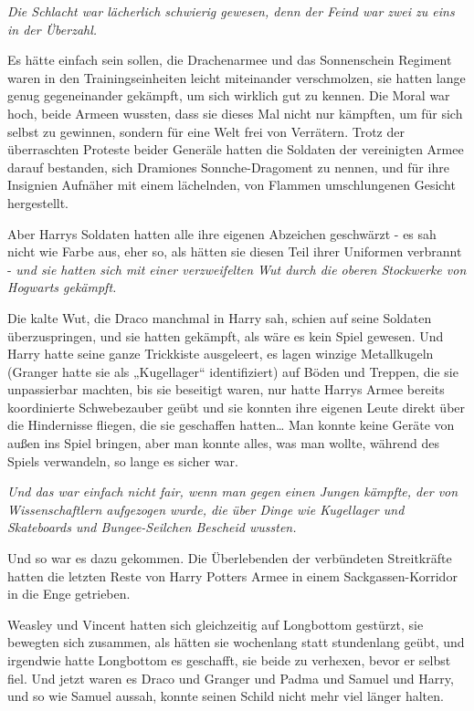 {\emph{Die Schlacht war lächerlich schwierig gewesen, denn der Feind war zwei zu eins in der Überzahl.}

Es hätte einfach sein sollen, die Drachenarmee und das Sonnenschein Regiment waren in den Trainingseinheiten leicht miteinander verschmolzen, sie hatten lange genug gegeneinander gekämpft, um sich wirklich gut zu kennen. Die Moral war hoch, beide Armeen wussten, dass sie dieses Mal nicht nur kämpften, um für sich selbst zu gewinnen, sondern für eine Welt frei von Verrätern. Trotz der überraschten Proteste beider Generäle hatten die Soldaten der vereinigten Armee darauf bestanden, sich Dramiones Sonnche-Dragoment zu nennen, und für ihre Insignien Aufnäher mit einem lächelnden, von Flammen umschlungenen Gesicht hergestellt.

Aber Harrys Soldaten hatten alle ihre eigenen Abzeichen geschwärzt - es sah nicht wie Farbe aus, eher so, als hätten sie diesen Teil ihrer Uniformen verbrannt - \emph{und sie hatten sich mit einer verzweifelten Wut durch die oberen Stockwerke von Hogwarts gekämpft.}

Die kalte Wut, die Draco manchmal in Harry sah, schien auf seine Soldaten überzuspringen, und sie hatten gekämpft, als wäre es kein Spiel gewesen. Und Harry hatte seine ganze Trickkiste ausgeleert, es lagen winzige Metallkugeln (Granger hatte sie als „Kugellager“ identifiziert) auf Böden und Treppen, die sie unpassierbar machten, bis sie beseitigt waren, nur hatte Harrys Armee bereits koordinierte Schwebezauber geübt und sie konnten ihre eigenen Leute direkt über die Hindernisse fliegen, die sie geschaffen hatten… Man konnte keine Geräte von außen ins Spiel bringen, aber man konnte alles, was man wollte, während des Spiels verwandeln, so lange es sicher war.

\emph{Und das war einfach nicht fair, wenn man gegen einen Jungen kämpfte, der von Wissenschaftlern aufgezogen wurde, die über Dinge wie Kugellager und Skateboards und Bungee-Seilchen Bescheid wussten.}

Und so war es dazu gekommen. Die Überlebenden der verbündeten Streitkräfte hatten die letzten Reste von Harry Potters Armee in einem Sackgassen-Korridor in die Enge getrieben.

Weasley und Vincent hatten sich gleichzeitig auf Longbottom gestürzt, sie bewegten sich zusammen, als hätten sie wochenlang statt stundenlang geübt, und irgendwie hatte Longbottom es geschafft, sie beide zu verhexen, bevor er selbst fiel. Und jetzt waren es Draco und Granger und Padma und Samuel und Harry, und so wie Samuel aussah, konnte seinen Schild nicht mehr viel länger halten.

}
